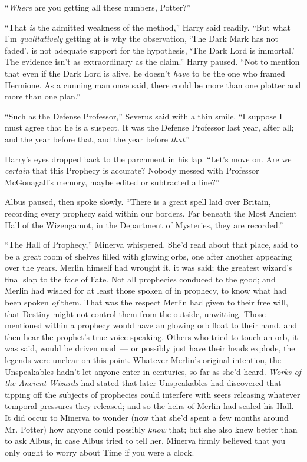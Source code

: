 ``\emph{Where} are you getting all these numbers, Potter?''

``That \emph{is} the admitted weakness of the method,'' Harry said readily. ``But what I'm \emph{qualitatively} getting at is why the observation, `The Dark Mark has not faded', is not adequate support for the hypothesis, `The Dark Lord is immortal.' The evidence isn't as extraordinary as the claim.'' Harry paused. ``Not to mention that even if the Dark Lord is alive, he doesn't \emph{have} to be the one who framed Hermione. As a cunning man once said, there could be more than one plotter and more than one plan.''

``Such as the Defense Professor,'' Severus said with a thin smile. ``I suppose I must agree that he is a suspect. It was the Defense Professor last year, after all; and the year before that, and the year before \emph{that}.''

Harry's eyes dropped back to the parchment in his lap. ``Let's move on. Are we \emph{certain} that this Prophecy is accurate? Nobody messed with Professor McGonagall's memory, maybe edited or subtracted a line?''

Albus paused, then spoke slowly. ``There is a great spell laid over Britain, recording every prophecy said within our borders. Far beneath the Most Ancient Hall of the Wizengamot, in the Department of Mysteries, they are recorded.''

``The Hall of Prophecy,'' Minerva whispered. She'd read about that place, said to be a great room of shelves filled with glowing orbs, one after another appearing over the years. Merlin himself had wrought it, it was said; the greatest wizard's final slap to the face of Fate. Not all prophecies conduced to the good; and Merlin had wished for at least those spoken of in prophecy, to know what had been spoken \emph{of} them. That was the respect Merlin had given to their free will, that Destiny might not control them from the outside, unwitting. Those mentioned within a prophecy would have an glowing orb float to their hand, and then hear the prophet's true voice speaking. Others who tried to touch an orb, it was said, would be driven mad~--- or possibly just have their heads explode, the legends were unclear on this point. Whatever Merlin's original intention, the Unspeakables hadn't let anyone enter in centuries, so far as she'd heard. \emph{Works of the Ancient Wizards} had stated that later Unspeakables had discovered that tipping off the subjects of prophecies could interfere with seers releasing whatever temporal pressures they released; and so the heirs of Merlin had sealed his Hall. It did occur to Minerva to wonder (now that she'd spent a few months around Mr. Potter) how anyone could possibly \emph{know} that; but she also knew better than to ask Albus, in case Albus tried to tell her. Minerva firmly believed that you only ought to worry about Time if you were a clock.

